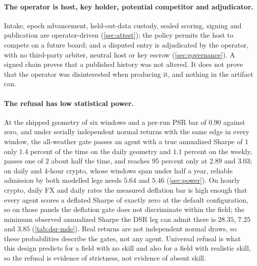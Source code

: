 \paragraph{The operator is host, key holder, potential competitor and adjudicator.} Intake, epoch advancement, held-out-data custody, sealed scoring, signing and publication are operator-driven (\cref{sec:attest}); the policy permits the host to compete on a future board; and a disputed entry is adjudicated by the operator, with no third-party arbiter, neutral host or key escrow (\cref{sec:governance}). A signed chain proves that a published history was not altered. It does not prove that the operator was disinterested when producing it, and nothing in the artifact can.

\paragraph{The refusal has low statistical power.} At the shipped geometry of six windows and a per-run PSR bar of $0.90$ against zero, and under serially independent normal returns with the same edge in every window, the all-weather gate passes an agent with a true annualized Sharpe of $1$ only $1.4$ percent of the time on the daily geometry and $1.1$ percent on the weekly, passes one of $2$ about half the time, and reaches 95 percent only at $2.89$ and $3.03$; on daily and 4-hour crypto, whose windows span under half a year, reliable admission by both modelled legs needs $5.64$ and $5.46$ (\cref{sec:power}). On hourly crypto, daily FX and daily rates the measured deflation bar is high enough that every agent scores a deflated Sharpe of exactly zero at the default configuration, so on those panels the deflation gate does not discriminate within the field; the minimum observed annualized Sharpe the DSR leg can admit there is $28.35$, $7.25$ and $3.85$ (\cref{tab:dsr-mde}). Real returns are not independent normal draws, so these probabilities describe the gates, not any agent. Universal refusal is what this design predicts for a field with no skill and also for a field with realistic skill, so the refusal is evidence of strictness, not evidence of absent skill.


